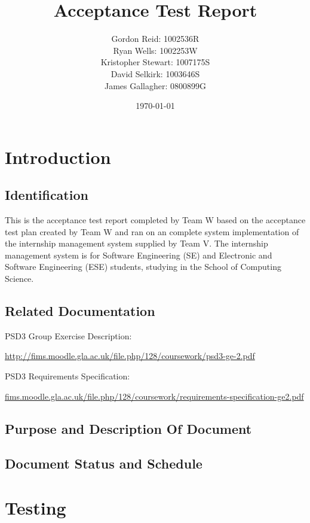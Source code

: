 \documentclass[11pt]{l3deliverable}
\title{Acceptance Test Report}
\author{
    Gordon Reid: 1002536R\\
    Ryan Wells: 1002253W\\
    Kristopher Stewart: 1007175S\\
    David Selkirk: 1003646S\\
    James Gallagher: 0800899G\\
}
\date{\today}
\begin{document}
\maketitle

\newpage

\tableofcontents

\newpage

\section{Introduction}

\subsection{Identification}

This is the acceptance test report completed by Team W based on the acceptance
test plan created by Team W and ran on an complete system implementation
of the internship management system supplied by Team V. The internship
management system is for Software Engineering (SE) and Electronic and
Software Engineering (ESE) students, studying in the School of Computing
Science.

\subsection{Related Documentation}

PSD3 Group Exercise Description:

\url{http://fims.moodle.gla.ac.uk/file.php/128/coursework/psd3-ge-2.pdf}

PSD3 Requirements Specification:

\url{fims.moodle.gla.ac.uk/file.php/128/coursework/requirements-specification-ge2.pdf}

\subsection{Purpose and Description Of Document}

\subsection{Document Status and Schedule}

\newpage

\section{Testing}
\end{document}
